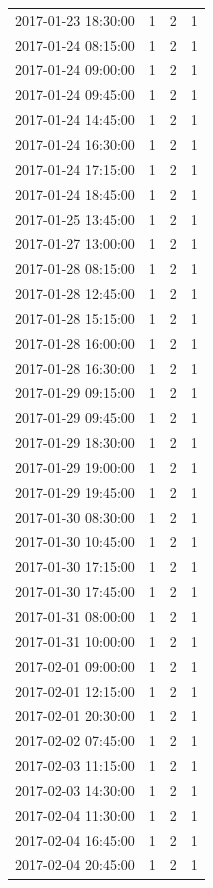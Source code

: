 \begin{tabular}{lrrr}
2017-01-23 18:30:00 & 1 & 2 & 1 \\
2017-01-24 08:15:00 & 1 & 2 & 1 \\
2017-01-24 09:00:00 & 1 & 2 & 1 \\
2017-01-24 09:45:00 & 1 & 2 & 1 \\
2017-01-24 14:45:00 & 1 & 2 & 1 \\
2017-01-24 16:30:00 & 1 & 2 & 1 \\
2017-01-24 17:15:00 & 1 & 2 & 1 \\
2017-01-24 18:45:00 & 1 & 2 & 1 \\
2017-01-25 13:45:00 & 1 & 2 & 1 \\
2017-01-27 13:00:00 & 1 & 2 & 1 \\
2017-01-28 08:15:00 & 1 & 2 & 1 \\
2017-01-28 12:45:00 & 1 & 2 & 1 \\
2017-01-28 15:15:00 & 1 & 2 & 1 \\
2017-01-28 16:00:00 & 1 & 2 & 1 \\
2017-01-28 16:30:00 & 1 & 2 & 1 \\
2017-01-29 09:15:00 & 1 & 2 & 1 \\
2017-01-29 09:45:00 & 1 & 2 & 1 \\
2017-01-29 18:30:00 & 1 & 2 & 1 \\
2017-01-29 19:00:00 & 1 & 2 & 1 \\
2017-01-29 19:45:00 & 1 & 2 & 1 \\
2017-01-30 08:30:00 & 1 & 2 & 1 \\
2017-01-30 10:45:00 & 1 & 2 & 1 \\
2017-01-30 17:15:00 & 1 & 2 & 1 \\
2017-01-30 17:45:00 & 1 & 2 & 1 \\
2017-01-31 08:00:00 & 1 & 2 & 1 \\
2017-01-31 10:00:00 & 1 & 2 & 1 \\
2017-02-01 09:00:00 & 1 & 2 & 1 \\
2017-02-01 12:15:00 & 1 & 2 & 1 \\
2017-02-01 20:30:00 & 1 & 2 & 1 \\
2017-02-02 07:45:00 & 1 & 2 & 1 \\
2017-02-03 11:15:00 & 1 & 2 & 1 \\
2017-02-03 14:30:00 & 1 & 2 & 1 \\
2017-02-04 11:30:00 & 1 & 2 & 1 \\
2017-02-04 16:45:00 & 1 & 2 & 1 \\
2017-02-04 20:45:00 & 1 & 2 & 1 \\

\end{tabular}
